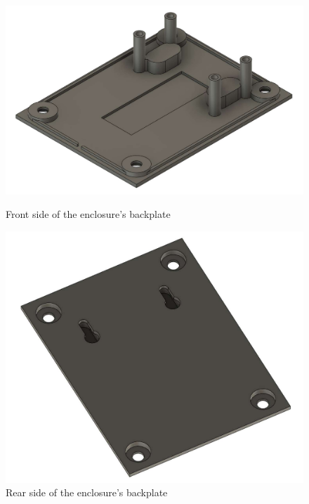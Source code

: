 \begin{figure}[h]
    \centering
    \begin{minipage}[b]{0.49\textwidth}
        \centering
        \includegraphics[width=1\textwidth]{Imagenes/Vectorial/backplate_front.pdf}
        \caption{Front side of the enclosure's backplate}
        \label{fig:backplate_front}
    \end{minipage}
    \hfill
    \begin{minipage}[b]{0.49\textwidth}
        \centering
        \includegraphics[width=1\textwidth]{Imagenes/Vectorial/backplate_back.pdf}
        \caption{Rear side of the enclosure's backplate}
        \label{fig:backplate_back}
    \end{minipage}
\end{figure}

